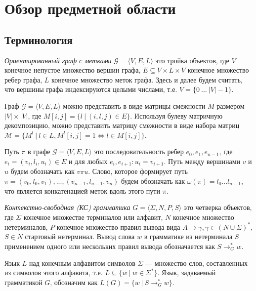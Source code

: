\section{Обзор предметной области}

\subsection{Терминология}

    
\textit{Ориентированный граф с метками} $\mathcal{G} = \langle V, E, L \rangle$ это тройка объектов, где $V$ конечное непустое множество вершин графа, $E \subseteq V \times L \times V$ конечное множество ребер графа, $L$ конечное множество меток графа. Здесь и далее будем считать, что вершины графа индексируются целыми числами, т.е. $V = \{0~...~|V| - 1\}$.

Граф $\mathcal{G} = \langle V, E, L \rangle$ можно представить в виде матрицы смежности $M$ размером $|V| \times |V|$, где $M[i,j] = \{l~|~(i,l,j) \in E\}$. Используя булеву матричную декомпозицию, можно представить матрицу смежности в виде набора матриц $\mathcal{M} = \{ M^l ~|~ l \in L, M^l[i,j] = 1 \iff l \in M[i,j]\}$.

Путь $\pi$ в графе $\mathcal{G} = \langle V, E, L \rangle$ это последовательность ребер $e_0,e_1,e_{n-1}$, где $e_i = (v_i, l_i, u_i) \in E$ и для любых $e_i, e_{i+1}: u_i = v_{i+1}$. Путь между вершинами $v$ и $u$ будем обозначать как $v \pi u$. Слово, которое формирует путь $\pi = (v_0, l_0, v_1), ... ,(v_{n-1}, l_{n-1}, v_n)$ будем обозначать как $\omega (\pi) = l_0 ... l_{n-1}$, что является конкатенацией меток вдоль этого пути $\pi$.

\textit{Контекстно-свободная (КС) грамматика} $G = \langle \Sigma, N, P, S \rangle$ это четверка объектов, где $\Sigma$ конечное множестве терминалов или алфавит, $N$ конечное множество нетерминалов, $P$ конечное множество правил вывода вида $A \rightarrow \gamma, \gamma \in (N \cup \Sigma)^*$, $S \in N$ стартовый нетерминал. Вывод слова $w$ в грамматике из нетерминала $S$ применением одного или нескольких правил вывода обозначается как $S \rightarrow^*_G w$.

Язык $L$ над конечным алфавитом символов $\Sigma$ --- множество слов, составленных из символов этого алфавита, т.е. $L \subseteq \{w~|~w \in \Sigma ^*\}$. Язык, задаваемый грамматикой $G$, обозначим как $L(G) = \{w~|~S \rightarrow^*_G w\}$.

